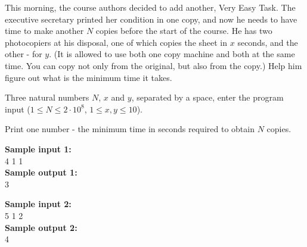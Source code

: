 \documentclass[a4paper]{article}
\begin{document}
This morning, the course authors decided to add another, Very Easy Task. The executive secretary printed her condition in one copy, and now he needs to have time to make another $N$ copies before the start of the course. He has two photocopiers at his disposal, one of which copies the sheet in $x$ seconds, and the other - for $y$. (It is allowed to use both one copy machine and both at the same time. You can copy not only from the original, but also from the copy.) Help him figure out what is the minimum time it takes.

Three natural numbers $N$, $x$ and $y$, separated by a space, enter the program input ($1 \le N \le 2 \cdot 10^{8}$,  $1 \le x, y \le 10$).

Print one number - the minimum time in seconds required to obtain $N$ copies.

\LINE

\noindent \textbf{Sample input 1:}\\
4 1 1\\

\noindent \textbf{Sample output 1:}\\
3

\SPACE

\noindent \textbf{Sample input 2:}\\
5 1 2\\

\noindent \textbf{Sample output 2:}\\
4
\end{document}
